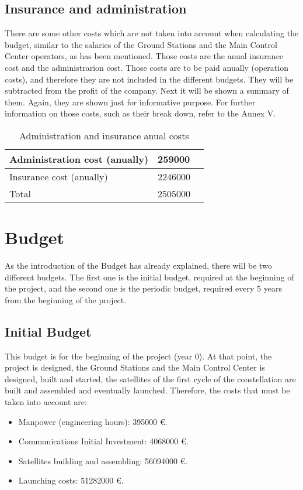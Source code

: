 \newpage
\section{Insurance and administration}
There are some other costs which are not taken into account when calculating the budget, similar to the salaries of the Ground Stations and the Main Control Center operators, as has been mentioned. Those costs are the anual insurance cost and the administrarion cost. Those costs are to be paid anually (operation costs), and therefore they are not included in the different budgets. They will be subtracted from the profit of the company. Next it will be shown a summary of them. Again, they are shown just for informative purpose. For further information on those costs, such as their break down, refer to the Annex V. 

\begin{table}[h]
\begin{center}
\begin{tabular}{ | l | l | }
\toprule
\hline
	Administration cost (anually) & 259000  \ \\ \hline
	Insurance cost (anually) & 2246000 \\ \hline
	\rowcolor[gray]{0.65}
	Total & 2505000 \ \\ \hline
	\bottomrule
\end{tabular}
\caption{Administration and insurance anual costs}
\end{center}
\end{table}

\chapter{Budget}
As the introduction of the Budget has already explained, there will be two different budgets. The first one is the initial budget, required at the beginning of the project, and the second one is the periodic budget, required every 5 years from the beginning of the project.

\section{Initial Budget}
This budget is for the beginning of the project (year 0). At that point, the project is designed, the Ground Stations and the Main Control Center is designed, built and started, the satellites of the first cycle of the constellation are built and assembled and eventually launched. Therefore, the costs that must be taken into account are:
\begin{itemize}
\item Manpower (engineering hours): 395000 \euro .
\item Communications Initial Investment: 4068000 \euro .
\item Satellites building and assembling: 56094000 \euro .
\item Launching costs: 51282000 \euro .
\end{itemize}

